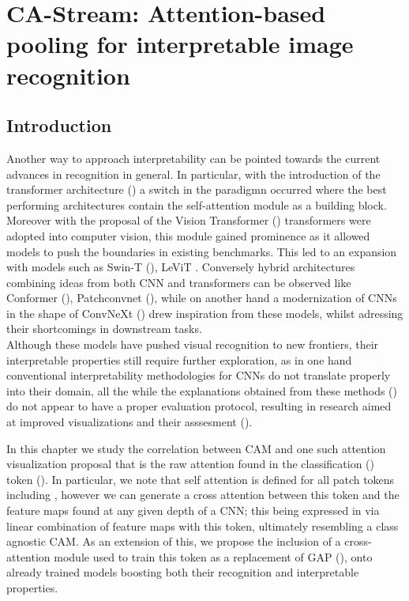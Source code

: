 \chapter{CA-Stream: Attention-based pooling for interpretable image recognition}
\chaptertoc{}
\section{Introduction}
\label{sec:intro}
\noindent Another way to approach interpretability can be pointed towards the current advances in recognition 
in general. In particular, with the introduction of the transformer architecture (\cite{vaswani2017attention})
 a switch in the paradigmn occurred where the best performing architectures contain the self-attention 
module as a building block. Moreover with the proposal of the Vision Transformer 
(\cite{dosovitskiy2020image}) transformers were adopted into computer vision, this module gained 
prominence as it allowed models to push the boundaries in existing benchmarks. This led to an 
expansion with models such as Swin-T (\cite{liu2021swin}), LeViT \cite{graham2021levit}. Conversely
hybrid architectures combining ideas from both CNN and transformers can be observed 
like Conformer (\cite{peng2021conformer}), Patchconvnet (\cite{touvron2021augmenting}),
while on another hand a modernization of CNNs in the shape of ConvNeXt (\cite{liu2022convnet}) drew 
inspiration from these models, whilst adressing their shortcomings in downstream tasks.\\

\noindent Although these models have pushed visual recognition to new frontiers, their interpretable
 properties still require further exploration, as in one hand conventional interpretability 
methodologies for CNNs do not translate properly into their domain, all the while the explanations 
obtained from these methods (\cite{abnar2020quantifying}) do not appear to have a proper evaluation 
protocol, resulting in research aimed at improved visualizations and their asssesment 
(\cite{chefer2021transformer}).

\noindent In this chapter we study the correlation between CAM and one such attention visualization 
proposal that is the raw attention found in the classification (\cls) token (\cite{devlin2018bert}).
In particular, we note that self attention is defined for all patch tokens including \cls, however 
we can generate a cross attention between this token and the feature maps found at any given depth 
of a CNN; this being expressed in via linear combination of feature maps with this token, ultimately 
resembling a class agnostic CAM. As an extension of this, we propose the inclusion of a 
cross-attention module used to train this token as a replacement of GAP (\cite{lin2013network}), 
onto already trained models boosting  both their recognition and interpretable properties.



